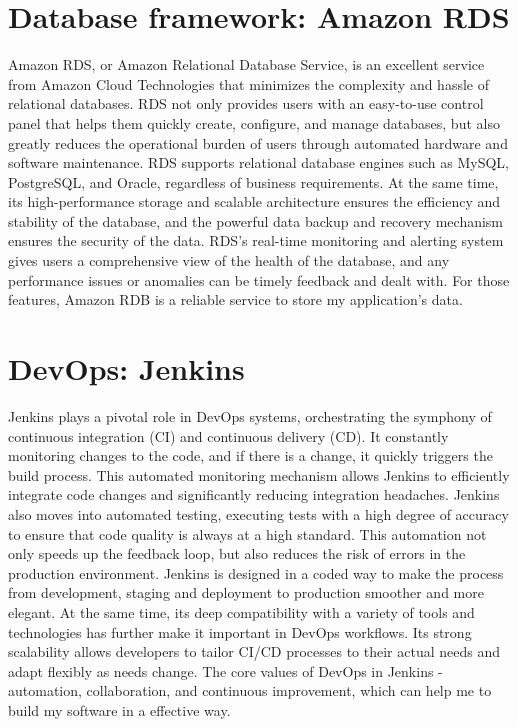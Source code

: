 \documentclass[12pt,two side]{report}
\begin{document}
\section{Database framework: Amazon RDS}
Amazon RDS, or Amazon Relational Database Service, is an excellent service from Amazon Cloud Technologies that minimizes the complexity and hassle of relational databases\cite{awsrds}. RDS not only provides users with an easy-to-use control panel that helps them quickly create, configure, and manage databases, but also greatly reduces the operational burden of users through automated hardware and software maintenance\cite{awsrds}. RDS supports relational database engines such as MySQL, PostgreSQL, and Oracle, regardless of business requirements. At the same time, its high-performance storage and scalable architecture ensures the efficiency and stability of the database, and the powerful data backup and recovery mechanism ensures the security of the data. RDS's real-time monitoring and alerting system gives users a comprehensive view of the health of the database, and any performance issues or anomalies can be timely feedback and dealt with\cite{awsrds}. For those features, Amazon RDB is a reliable service to store my application's data. 
\section{DevOps: Jenkins}
Jenkins plays a pivotal role in DevOps systems, orchestrating the symphony of continuous integration (CI) and continuous delivery (CD)\cite{jenkins}. It constantly monitoring changes to the code, and if there is a change, it quickly triggers the build process. This automated monitoring mechanism allows Jenkins to efficiently integrate code changes and significantly reducing integration headaches. Jenkins also moves into automated testing, executing tests with a high degree of accuracy to ensure that code quality is always at a high standard. This automation not only speeds up the feedback loop, but also reduces the risk of errors in the production environment\cite{jenkins}. Jenkins is designed in a coded way to make the process from development, staging and deployment to production smoother and more elegant. At the same time, its deep compatibility with a variety of tools and technologies has further make it important in DevOps workflows\cite{jenkins}. Its strong scalability allows developers to tailor CI/CD processes to their actual needs and adapt flexibly as needs change. The core values of DevOps in Jenkins - automation, collaboration, and continuous improvement, which can help me to build my software in a effective way.
\end{document}
